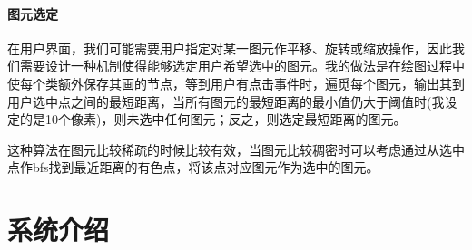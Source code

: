 \documentclass[a4paper,UTF8]{article}
\theoremstyle{definition}
\begin{document}
\paragraph{图元选定}
在用户界面，我们可能需要用户指定对某一图元作平移、旋转或缩放操作，因此我们需要设计一种机制使得能够选定用户希望选中的图元。我的做法是在绘图过程中使每个类额外保存其画的节点，等到用户有点击事件时，遍觅每个图元，输出其到用户选中点之间的最短距离，当所有图元的最短距离的最小值仍大于阈值时(我设定的是10个像素)，则未选中任何图元；反之，则选定最短距离的图元。
\par 这种算法在图元比较稀疏的时候比较有效，当图元比较稠密时可以考虑通过从选中点作bfs找到最近距离的有色点，将该点对应图元作为选中的图元。
\section{系统介绍}
\end{document}
